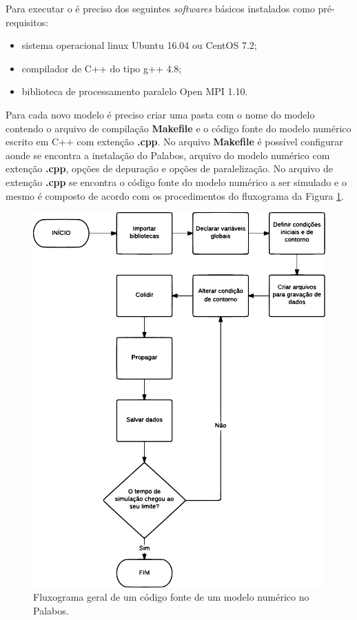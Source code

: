 Para executar o  é preciso dos seguintes \textit{softwares} básicos instalados como pré-requisitos:

\begin{itemize}
  \item sistema operacional linux Ubuntu 16.04 ou CentOS 7.2;
  \item compilador de C++ do tipo g++ 4.8;
  \item biblioteca de processamento paralelo Open MPI 1.10. 
\end{itemize}

Para cada novo modelo é preciso criar uma pasta com o nome do modelo contendo o arquivo de compilação \textbf{Makefile} e o código fonte do modelo numérico escrito em C++ com extenção \textbf{.cpp}. No arquivo \textbf{Makefile} é possível configurar aonde se encontra a instalação do Palabos, arquivo do modelo numérico com extenção \textbf{.cpp}, opções de depuração e opções de paralelização. No arquivo de extenção \textbf{.cpp} se encontra o código fonte do modelo numérico a ser simulado e o mesmo é composto de acordo com os procedimentos do fluxograma da Figura \ref{fig:palabos_fluxo}.


\begin{figure}[ht!]
\centering
  \includegraphics[width=.8\linewidth]{figuras/palabos_modelo_fluxo.pdf}
  \caption[Fluxograma de um modelo numérico no Palabos]{Fluxograma geral de um código fonte de um modelo numérico no Palabos.}
  \label{fig:palabos_fluxo}
\end{figure}

